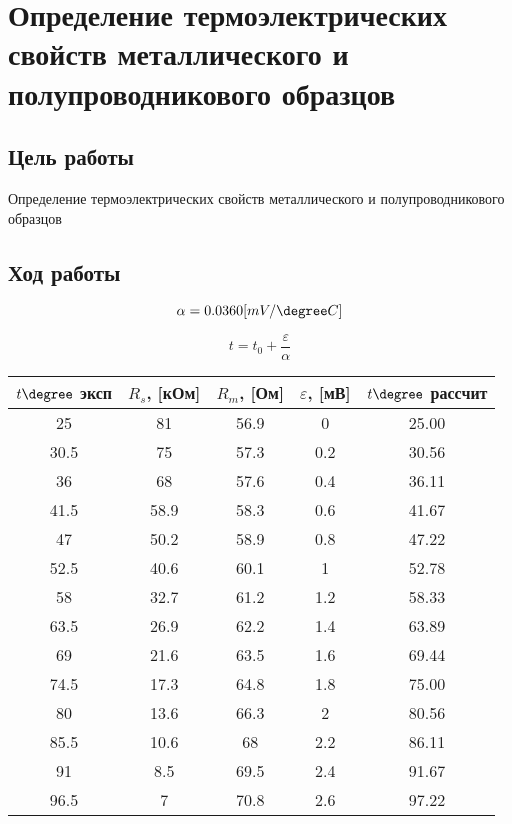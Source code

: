 \chapter{Определение термоэлектрических свойств металлического и полупроводникового образцов}

\section{Цель работы}

Определение термоэлектрических свойств металлического и полупроводникового образцов

\section{Ход работы}

\[
\alpha= 0.0360 [mV/\degree C]
\]

\[
t = t_0+\frac{\varepsilon}{\alpha}
\]



\begin{table}[H]
	\centering
	\begin{tabular}{|c|c|c|c|c|}
		\hline
		$t \degree$ эксп & $R_s$, [кОм] & $R_m$, [Ом] & $\varepsilon$, [мВ] & $t \degree$ рассчит  \\ \hline
		25 & 81 & 56.9 & 0 & 25.00\\ \hline
		30.5 & 75 & 57.3 & 0.2 & 30.56\\ \hline
		36 & 68 & 57.6 & 0.4 & 36.11\\ \hline
		41.5 & 58.9 & 58.3 & 0.6 & 41.67\\ \hline
		47 & 50.2 & 58.9 & 0.8 & 47.22\\ \hline
		52.5 & 40.6 & 60.1 & 1 & 52.78\\ \hline
		58 & 32.7 & 61.2 & 1.2 & 58.33\\ \hline
		63.5 & 26.9 & 62.2 & 1.4 & 63.89\\ \hline
		69 & 21.6 & 63.5 & 1.6 & 69.44\\ \hline
		74.5 & 17.3 & 64.8 & 1.8 & 75.00\\ \hline
		80 & 13.6 & 66.3 & 2 & 80.56\\ \hline
		85.5 & 10.6 & 68 & 2.2 & 86.11\\ \hline
		91 & 8.5 & 69.5 & 2.4 & 91.67\\ \hline
		96.5 & 7 & 70.8 & 2.6& 97.22\\ \hline
	\end{tabular}
\end{table}



